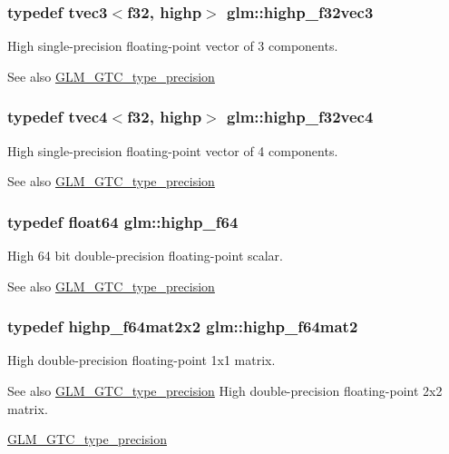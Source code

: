 \subsubsection[{highp\+\_\+f32vec3}]{\setlength{\rightskip}{0pt plus 5cm}typedef tvec3$<${\bf f32}, highp$>$ {\bf glm\+::highp\+\_\+f32vec3}}\label{namespaceglm_a23c60c992dfe341ba66054986f935278}
High single-\/precision floating-\/point vector of 3 components. \begin{DoxySeeAlso}{See also}
\hyperlink{group__gtc__type__precision}{G\+L\+M\+\_\+\+G\+T\+C\+\_\+type\+\_\+precision} 
\end{DoxySeeAlso}
\hypertarget{namespaceglm_a55f76ea4dec80b99c68501af47db2eb1}{}
\subsubsection[{highp\+\_\+f32vec4}]{\setlength{\rightskip}{0pt plus 5cm}typedef tvec4$<${\bf f32}, highp$>$ {\bf glm\+::highp\+\_\+f32vec4}}\label{namespaceglm_a55f76ea4dec80b99c68501af47db2eb1}
High single-\/precision floating-\/point vector of 4 components. \begin{DoxySeeAlso}{See also}
\hyperlink{group__gtc__type__precision}{G\+L\+M\+\_\+\+G\+T\+C\+\_\+type\+\_\+precision} 
\end{DoxySeeAlso}
\hypertarget{namespaceglm_ab1306a5a8ae99fb2867b548b1546bbe0}{}
\subsubsection[{highp\+\_\+f64}]{\setlength{\rightskip}{0pt plus 5cm}typedef {\bf float64} {\bf glm\+::highp\+\_\+f64}}\label{namespaceglm_ab1306a5a8ae99fb2867b548b1546bbe0}
High 64 bit double-\/precision floating-\/point scalar. \begin{DoxySeeAlso}{See also}
\hyperlink{group__gtc__type__precision}{G\+L\+M\+\_\+\+G\+T\+C\+\_\+type\+\_\+precision} 
\end{DoxySeeAlso}
\hypertarget{namespaceglm_a7d9fd446fd43310ba6f63c8f9468acc0}{}
\subsubsection[{highp\+\_\+f64mat2}]{\setlength{\rightskip}{0pt plus 5cm}typedef {\bf highp\+\_\+f64mat2x2} {\bf glm\+::highp\+\_\+f64mat2}}\label{namespaceglm_a7d9fd446fd43310ba6f63c8f9468acc0}
High double-\/precision floating-\/point 1x1 matrix. \begin{DoxySeeAlso}{See also}
\hyperlink{group__gtc__type__precision}{G\+L\+M\+\_\+\+G\+T\+C\+\_\+type\+\_\+precision} High double-\/precision floating-\/point 2x2 matrix. 

\hyperlink{group__gtc__type__precision}{G\+L\+M\+\_\+\+G\+T\+C\+\_\+type\+\_\+precision} 
\end{DoxySeeAlso}
\hypertarget{namespaceglm_ab1d0281d417a194926995187e2d72f94}{}
